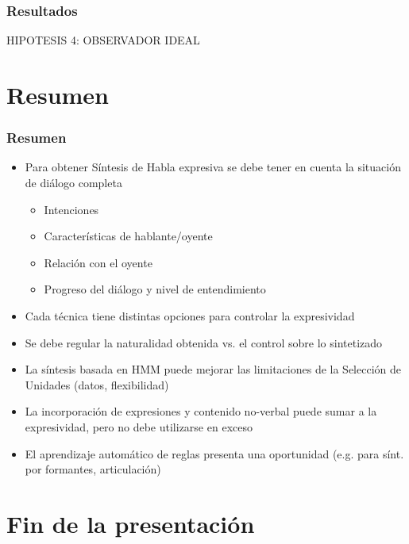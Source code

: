 \documentclass[10pt,presentation]{beamer}
\begin{document}
\begin{frame}
  \frametitle{Resultados}
HIPOTESIS 4: OBSERVADOR IDEAL
\end{frame}

\section{Resumen}
\begin{frame}
  \frametitle{Resumen}
  \begin{itemize}
    \item \pause Para obtener Síntesis de Habla expresiva se debe tener en cuenta la situación de diálogo completa \pause
    \begin{itemize}
      \item Intenciones \pause
      \item Características de hablante/oyente \pause
      \item Relación con el oyente \pause
      \item Progreso del diálogo y nivel de entendimiento \pause
    \end{itemize}
    \item Cada técnica tiene distintas opciones para controlar la expresividad \pause
    \item Se debe regular la naturalidad obtenida vs. el control sobre lo sintetizado \pause
    \item La síntesis basada en HMM puede mejorar las limitaciones de la Selección de Unidades (datos, flexibilidad) \pause
    \item La incorporación de expresiones y contenido no-verbal puede sumar a la expresividad, pero no debe utilizarse en exceso \pause
    \item El aprendizaje automático de reglas presenta una oportunidad (e.g. para sínt. por formantes, articulación)
  \end{itemize}
\end{frame}

\section{Fin de la presentaci\'on}
\begin{frame}%
  \titlepage
\end{frame}
\end{document}
